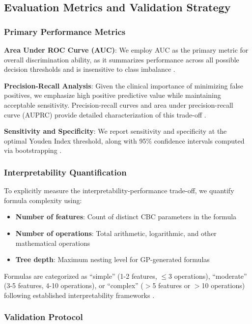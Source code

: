 \documentclass[12pt,a4paper]{article}
\begin{document}
\subsection{Evaluation Metrics and Validation Strategy}

\subsubsection{Primary Performance Metrics}

\textbf{Area Under ROC Curve (AUC)}: We employ AUC as the primary metric for overall discrimination ability, as it summarizes performance across all possible decision thresholds and is insensitive to class imbalance \cite{ref21,ref22}.

\textbf{Precision-Recall Analysis}: Given the clinical importance of minimizing false positives, we emphasize high positive predictive value while maintaining acceptable sensitivity. Precision-recall curves and area under precision-recall curve (AUPRC) provide detailed characterization of this trade-off \cite{ref12}.

\textbf{Sensitivity and Specificity}: We report sensitivity and specificity at the optimal Youden Index threshold, along with 95\% confidence intervals computed via bootstrapping \cite{ref19,ref28}.

\subsubsection{Interpretability Quantification}

To explicitly measure the interpretability-performance trade-off, we quantify formula complexity using:

\begin{itemize}
\item \textbf{Number of features}: Count of distinct CBC parameters in the formula
\item \textbf{Number of operations}: Total arithmetic, logarithmic, and other mathematical operations
\item \textbf{Tree depth}: Maximum nesting level for GP-generated formulas
\end{itemize}

Formulas are categorized as ``simple'' (1-2 features, $\leq$3 operations), ``moderate'' (3-5 features, 4-10 operations), or ``complex'' ($>$5 features or $>$10 operations) following established interpretability frameworks \cite{ref12,ref23}.

\subsubsection{Validation Protocol}
\end{document}
